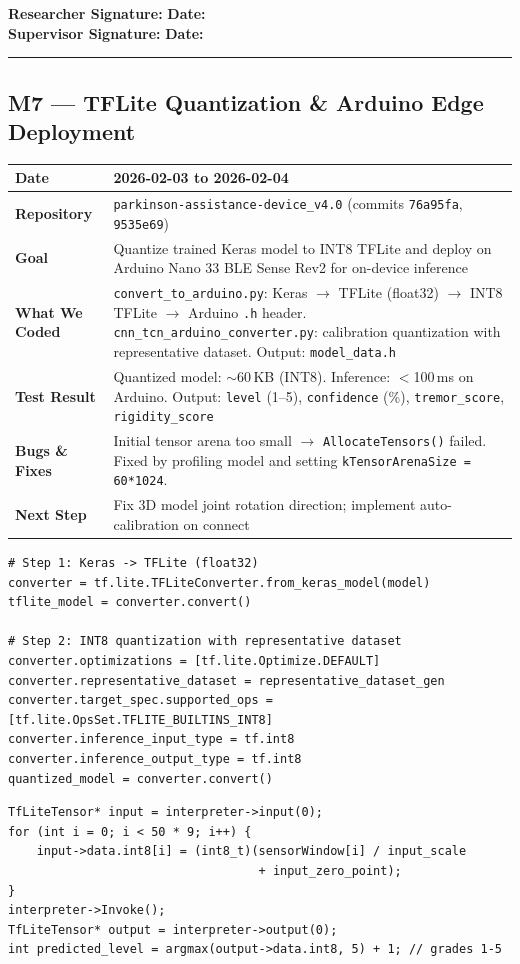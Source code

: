 \documentclass[12pt,a4paper]{article}
\makeatletter
\newcommand{\sigblock}{%
  \vspace{0.6em}
  \noindent\textbf{Researcher Signature:} \underline{\hspace{6cm}} \quad \textbf{Date:} \underline{\hspace{3cm}}\\[0.4em]
  \noindent\textbf{Supervisor Signature:} \underline{\hspace{6cm}} \quad \textbf{Date:} \underline{\hspace{3cm}}
  \vspace{0.4em}\hrule\vspace{0.6em}
}
\newenvironment{milestonetable}{%
  \begin{tcolorbox}[colback=codebg, colframe=codeframe, breakable, left=4pt, right=4pt, top=4pt, bottom=4pt]
  \begin{tabularx}{\linewidth}{@{}>{\bfseries}p{3.2cm} X@{}}
  \toprule
}{%
  \bottomrule
  \end{tabularx}
  \end{tcolorbox}
}
\newcommand{\mrow}[2]{\midrule #1 & #2 \\}
\makeatother
\begin{document}
\sigblock

\subsection{M7 --- TFLite Quantization \& Arduino Edge Deployment}

\begin{milestonetable}
\mrow{Date}{2026-02-03 to 2026-02-04}
\mrow{Repository}{\texttt{parkinson-assistance-device\_v4.0} (commits \texttt{76a95fa}, \texttt{9535e69})}
\mrow{Goal}{Quantize trained Keras model to INT8 TFLite and deploy on Arduino Nano 33 BLE Sense Rev2 for on-device inference}
\mrow{What We Coded}{\texttt{convert\_to\_arduino.py}: Keras $\rightarrow$ TFLite (float32) $\rightarrow$ INT8 TFLite $\rightarrow$ Arduino \texttt{.h} header. \texttt{cnn\_tcn\_arduino\_converter.py}: calibration quantization with representative dataset. Output: \texttt{model\_data.h}}
\mrow{Test Result}{Quantized model: $\sim$60\,KB (INT8). Inference: $<$100\,ms on Arduino. Output: \texttt{level} (1--5), \texttt{confidence} (\%), \texttt{tremor\_score}, \texttt{rigidity\_score}}
\mrow{Bugs \& Fixes}{Initial tensor arena too small $\rightarrow$ \texttt{AllocateTensors()} failed. Fixed by profiling model and setting \texttt{kTensorArenaSize = 60*1024}.}
\mrow{Next Step}{Fix 3D model joint rotation direction; implement auto-calibration on connect}
\end{milestonetable}

\begin{lstlisting}[style=pythonstyle, caption={convert\_to\_arduino.py -- INT8 quantization pipeline}]
# Step 1: Keras -> TFLite (float32)
converter = tf.lite.TFLiteConverter.from_keras_model(model)
tflite_model = converter.convert()

# Step 2: INT8 quantization with representative dataset
converter.optimizations = [tf.lite.Optimize.DEFAULT]
converter.representative_dataset = representative_dataset_gen
converter.target_spec.supported_ops = [tf.lite.OpsSet.TFLITE_BUILTINS_INT8]
converter.inference_input_type = tf.int8
converter.inference_output_type = tf.int8
quantized_model = converter.convert()
\end{lstlisting}

\begin{lstlisting}[style=cppstyle, caption={complete\_parkinson\_device.ino -- On-device inference}]
TfLiteTensor* input = interpreter->input(0);
for (int i = 0; i < 50 * 9; i++) {
    input->data.int8[i] = (int8_t)(sensorWindow[i] / input_scale
                                   + input_zero_point);
}
interpreter->Invoke();
TfLiteTensor* output = interpreter->output(0);
int predicted_level = argmax(output->data.int8, 5) + 1; // grades 1-5
\end{lstlisting}
\end{document}
